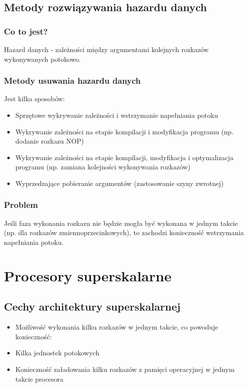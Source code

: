 \documentclass[a4paper,twoside]{article}
\begin{document}
   \subsection*{Metody rozwiązywania hazardu danych}
	   \subsubsection*{Co to jest?}
	   Hazard danych - zależności między argumentami kolejnych rozkazów wykonywanych potokowo.
	   \subsubsection*{Metody usuwania hazardu danych}
	   Jest kilka sposobów:
	   \begin{itemize}
	   		\item Sprzętowe wykrywanie zależności i wstrzymanie napełniania potoku
	   		\item Wykrywanie zależności na etapie kompilacji i modyfikacja programu (np. dodanie rozkazu NOP)
	   		\item Wykrywanie zależności na etapie kompilacji, modyfikacja i optymalizacja programu (np. zamiana kolejności wykonywania rozkazów)
	   		\item Wyprzedzające pobieranie argumentów (zastosowanie szyny zwrotnej)
	   \end{itemize}
	   \subsubsection*{Problem}
		Jeśli faza wykonania rozkazu nie będzie mogła być wykonana w jednym takcie (np. dla rozkazów zmiennoprzecinkowych), to zachodzi konieczność wstrzymania napełniania potoku.
	        	
    \section*{Procesory superskalarne}
    	\subsection*{Cechy architektury superskalarnej}
        	\begin{itemize}
            \item Możliwość wykonania kilku rozkazów w jednym takcie, co powoduje konieczność:
            \item Kilka jednostek potokowych
            \item Konieczność załadowania kilku rozkazów z pamięci operacyjnej w jednym takcie procesora
            \end{itemize}
            
\end{document}
